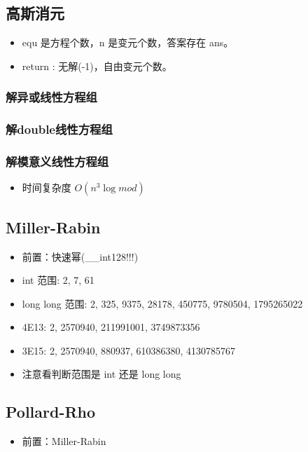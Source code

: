 \subsection{高斯消元}
\begin{itemize}
    \item equ 是方程个数，n 是变元个数，答案存在 ans。
    \item return : 无解(-1)，自由变元个数。
\end{itemize}

\subsubsection{解异或线性方程组}


\subsubsection{解double线性方程组}


\subsubsection{解模意义线性方程组}
\begin{itemize}
    \item 时间复杂度 $O(n^3 \log{mod})$
\end{itemize}

\subsection{Miller-Rabin}
\begin{itemize}
    \item 前置：快速幂(\_\_int128!!!)
    \item int 范围: {2, 7, 61}
    \item long long 范围: {2, 325, 9375, 28178, 450775, 9780504, 1795265022}
    \item 4E13: {2, 2570940, 211991001, 3749873356}
    \item 3E15: {2, 2570940, 880937, 610386380, 4130785767}
    \item 注意看判断范围是 int 还是 long long
\end{itemize}


\subsection{Pollard-Rho}
\begin{itemize}
    \item 前置：Miller-Rabin
\end{itemize}

